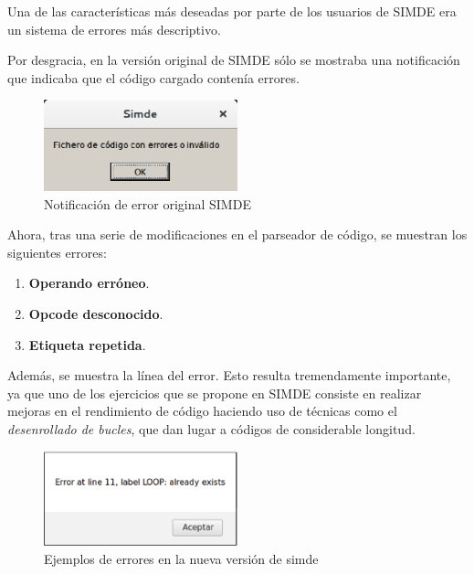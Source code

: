Una de las características más deseadas por parte de los usuarios de SIMDE era
un sistema de errores más descriptivo. 

\bigskip
Por desgracia, en la versión original de SIMDE sólo se mostraba una notificación que indicaba
que el código cargado contenía errores.

\begin{figure}[!th]
\begin{center}
\includegraphics[width=0.5\textwidth]{images/cap6/errorsimde.eps}
\caption{Notificación de error original SIMDE}
\end{center}
\end{figure}

Ahora, tras una serie de modificaciones en el parseador de código, se muestran los siguientes errores:

\begin{enumerate}
\item \textbf{Operando erróneo}.
\item \textbf{Opcode desconocido}.
\item \textbf{Etiqueta repetida}.
\end{enumerate}

Además, se muestra la línea del error. Esto resulta tremendamente importante, 
ya que uno de los ejercicios que se propone en SIMDE consiste en realizar mejoras en el rendimiento
de código haciendo uso de técnicas como el \textit{desenrollado de bucles}, que dan lugar a códigos de considerable
longitud.

\begin{figure}[!th]
\begin{center}
\includegraphics[width=0.5\textwidth]{images/cap6/nuevoerrorsimde.eps}
\caption{Ejemplos de errores en la nueva versión de simde}
\end{center}
\end{figure}
